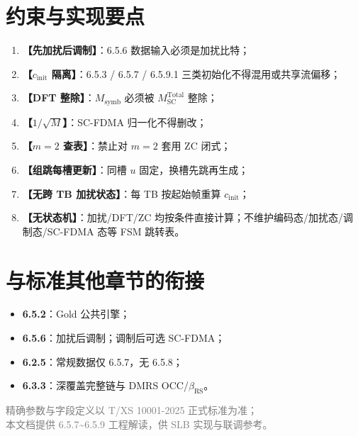 \documentclass[11pt,a4paper]{ctexart}
\begin{document}
\section{约束与实现要点}

\begin{enumerate}[nosep]
  \item \textbf{【先加扰后调制】}：6.5.6 数据输入必须是加扰比特；
  \item \textbf{【$c_{\mathrm{init}}$ 隔离】}：6.5.3 / 6.5.7 / 6.5.9.1 三类初始化不得混用或共享流偏移；
  \item \textbf{【DFT 整除】}：$M_{\mathrm{symb}}$ 必须被 $M_{\mathrm{SC}}^{\mathrm{Total}}$ 整除；
  \item \textbf{【$1/\sqrt{M}$】}：SC-FDMA 归一化不得删改；
  \item \textbf{【$m{=}2$ 查表】}：禁止对 $m{=}2$ 套用 ZC 闭式；
  \item \textbf{【组跳每槽更新】}：同槽 $u$ 固定，换槽先跳再生成；
  \item \textbf{【无跨 TB 加扰状态】}：每 TB 按起始帧重算 $c_{\mathrm{init}}$；
  \item \textbf{【无状态机】}：加扰/DFT/ZC 均按条件直接计算；不维护编码态/加扰态/调制态/SC-FDMA 态等 FSM 跳转表。
\end{enumerate}

\section{与标准其他章节的衔接}

\begin{itemize}[nosep]
  \item \textbf{6.5.2}：Gold 公共引擎；
  \item \textbf{6.5.6}：加扰后调制；调制后可选 SC-FDMA；
  \item \textbf{6.2.5}：常规数据仅 6.5.7，无 6.5.8；
  \item \textbf{6.3.3}：深覆盖完整链与 DMRS OCC/$β_{\mathrm{RS}}$。
\end{itemize}

\vfill
\begin{center}
\small\textcolor{gray}{精确参数与字段定义以 T/XS 10001-2025 正式标准为准；\\
本文档提供 6.5.7\textasciitilde 6.5.9 工程解读，供 SLB 实现与联调参考。}
\end{center}
\end{document}
